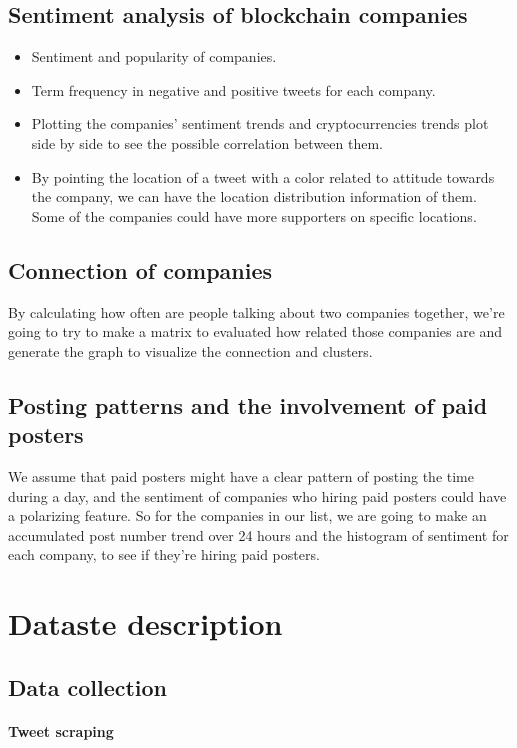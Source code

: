 \documentclass{article}
\begin{document}
\subsection{Sentiment analysis of blockchain companies}
\begin{itemize}
\item Sentiment and popularity of companies.
\item Term frequency in negative and positive tweets for each company.
\item Plotting the companies' sentiment trends and cryptocurrencies trends plot side by side to see the possible correlation between them.
\item By pointing the location of a tweet with a color related to attitude towards the company, we can have the location distribution information of them. Some of the companies could have more supporters on specific locations.
\end{itemize}

\subsection{Connection of companies}
By calculating how often are people talking about two companies together, we're going to try to make a matrix to evaluated how related those companies are and generate the graph to visualize the connection and clusters.

\subsection{Posting patterns and the involvement of paid posters}
We assume that paid posters might have a clear pattern of posting the time during a day, and the sentiment of companies who hiring paid posters could have a polarizing feature. So for the companies in our list, we are going to make an accumulated post number trend over 24 hours and the histogram of sentiment for each company, to see if they're hiring paid posters.

\section{Dataste description}
\subsection{Data collection}
\paragraph{Tweet scraping} 
\end{document}
